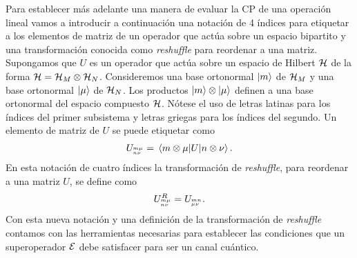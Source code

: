 Para establecer más adelante una manera de evaluar la CP de una operación 
lineal vamos a introducir a continuación una notación de 4 índices para 
etiquetar a los elementos de matriz de un operador que actúa 
sobre un espacio bipartito y una transformación conocida como 
\textit{reshuffle} para reordenar a una matriz. 
Supongamos que $U$ es un operador 
que actúa sobre un espacio de Hilbert 
$\mathcal{H}$ de la forma $\mathcal{H}=\mathcal{H}_M\otimes\mathcal{H}_N$.
Consideremos una base ortonormal $\ket{m}$ de $\mathcal{H}_M$ 
y una base ortonormal $\ket{\mu}$ de $\mathcal{H}_N$. 
Los productos $\ket{m}\otimes\ket{\mu}$ definen a una base
ortonormal del espacio compuesto $\mathcal{H}$. 
Nótese el uso de letras latinas para los índices del
primer subsistema y letras griegas para los índices del segundo. 
Un elemento de matriz de $U$ se puede etiquetar como
\begin{align}
U_\ind{m\mu}{n\nu}=\matrixel{m\otimes \mu}{U}{n\otimes \nu}.
\label{eq:4indices}
\end{align}
En esta notación de cuatro índices la transformación de \textit{reshuffle}, 
para reordenar a una matriz  $U$, se define 
como~\cite{bengtsson_zyczkowski_2017}
\begin{align}
U^R_{{}^{m\mu}_{n\nu}} = U_{{}^{mn}_{\mu\nu}}.
\label{eq:R-4ind}
\end{align}
Con esta nueva notación y una definición de 
la transformación de \textit{reshuffle}
contamos con las herramientas necesarias para establecer 
las condiciones que un superoperador $\mathcal{E}$ debe satisfacer 
para ser un canal cuántico.

